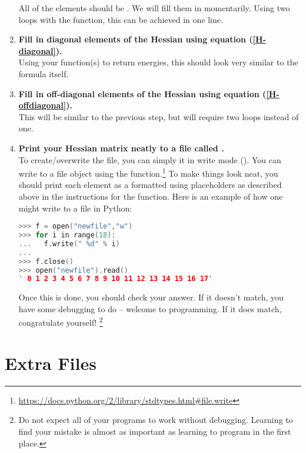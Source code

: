 \documentclass[11pt]{article}
\begin{document}
\begin{enumerate}[label=\textbf{\arabic*}]
All of the elements should be .  We will fill them in momentarily.
Using two  loops with the  function, this can be achieved in one line.
\item {\bf Fill in diagonal elements of the Hessian using equation (\ref{H-diagonal}).}\\
Using your function(s) to return energies, this should look very similar to the formula itself.
\item {\bf Fill in off-diagonal elements of the Hessian using equation (\ref{H-offdiagonal}).}\\
This will be similar to the previous step, but will require two  loops instead of one.
\item {\bf Print your Hessian matrix neatly to a file called .}\\
To create/overwrite the file, you can simply  it in write mode
(). You can write to a file object using the 
function.\footnote{\url{https://docs.python.org/2/library/stdtypes.html\#file.write}}
To make things look neat, you should print each element as a formatted
 using placeholders as described above in the instructions for the
 function. Here is an example of how one might write to a
file in Python:
\begin{addmargin}{2cm}{}
\begin{lstlisting}[language=c++]
>>> f = open("newfile","w")
>>> for i in range(18):
...   f.write(" %d" % i)
... 
>>> f.close()
>>> open("newfile").read()
' 0 1 2 3 4 5 6 7 8 9 10 11 12 13 14 15 16 17'
\end{lstlisting}
\end{addmargin}
Once this is done, you should check your answer.
If it doesn't match, you have some debugging to do -- welcome to programming.
If it does match, congratulate yourself! \footnote{Do not expect all of your
programs to work without debugging.  Learning to find your mistake is almost as
important as learning to program in the first place.}
\end{enumerate}


\newpage
\section{Extra Files}
\end{document}
